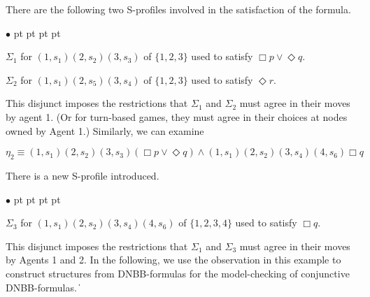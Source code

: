 \documentclass[11pt]{article}
\newcommand{\pfrr}{\Box}
\newcommand{\pevt}{\Diamond}
\def\qed{\ifmmode\|\else{\unskip\nobreak\hfil
\penalty50\hskip1em\null\nobreak\hfil$\blacksquare$
\parfillskip=0pt\finalhyphendemerits=0\endgraf}\fi}
\newenvironment{list1}{\begin{list}{$\bullet$}
{\topsep 0 pt \parsep 0 pt \partopsep 0 pt \itemsep 0 pt}}{\end{list}}
\begin{document}
There are the following
two S-profiles involved in the satisfaction of the formula.
\begin{list1}
\item $\Sigma_1$ for $(1,s_1)(2,s_2)(3,s_3)$ 
	of $\{1,2,3\}$ 
	used to satisfy $\pfrr p\vee \pevt q$.
\item $\Sigma_2$ for  $(1,s_1)(2,s_5)(3,s_4)$ 
	of $\{1,2,3\}$ used to satisfy $\pevt r$.
\end{list1}
This disjunct imposes the restrictions that 
$\Sigma_1$ and $\Sigma_2$ must agree in their moves by agent 1.  
(Or for turn-based games, they must agree in their choices at nodes
owned by Agent 1.)  
Similarly, we can examine 
\begin{center}
$\eta_2\equiv (1,s_1)(2,s_2)(3,s_3)(
	    \pfrr p\vee \pevt q
	    )\wedge  
	  (1,s_1)(2,s_2)(3,s_4)(4,s_6)
	     \pfrr q$
\end{center}
There is a new S-profile introduced. 
\begin{list1}
\item $\Sigma_3$ for  $(1,s_1)(2,s_2)(3,s_4)(4,s_6)$ 
	of $\{1,2,3,4\}$ used to satisfy $\pfrr q$.
\end{list1}
This disjunct imposes the restrictions that 
$\Sigma_1$ and $\Sigma_3$ must agree in their moves by Agents 1 and 2.
In the following, we use the observation in this example to
construct structures from DNBB-formulas for the model-checking
of conjunctive DNBB-formulas.
\qed
\end{document}
